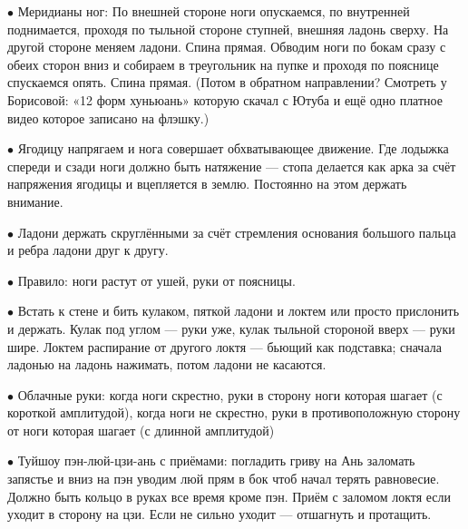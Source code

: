 \item{$\bullet$} Меридианы ног:
 По внешней стороне ноги опускаемся, по внутренней поднимается, проходя по тыльной стороне ступней, внешняя ладонь сверху. На другой стороне меняем ладони. Спина прямая.
 Обводим ноги по бокам сразу с обеих сторон вниз и собираем в треугольник на пупке и проходя по пояснице спускаемся опять. Спина прямая. (Потом в обратном направлении? Смотреть у Борисовой: «12 форм хуньюань» которую скачал с Ютуба и ещё одно платное видео которое записано на флэшку.)

\item{$\bullet$} Ягодицу напрягаем и нога совершает обхватывающее движение.
Где лодыжка спереди и сзади ноги должно быть натяжение --- стопа делается как арка за счёт напряжения ягодицы и вцепляется в землю. Постоянно на этом держать внимание.

\item{$\bullet$} Ладони держать скруглёнными за счёт стремления основания большого пальца и ребра ладони друг к другу.

\item{$\bullet$} Правило: ноги растут от ушей, руки от поясницы.

\item{$\bullet$} Встать к стене и бить кулаком, пяткой ладони и локтем или просто прислонить и держать. Кулак под углом --- руки уже, кулак тыльной стороной вверх --- руки шире. Локтем распирание от другого локтя --- бьющий как подставка; сначала ладонью на ладонь нажимать, потом ладони не касаются.

\item{$\bullet$} Облачные руки: когда ноги скрестно, руки в сторону ноги которая шагает
(с короткой амплитудой), когда ноги не скрестно, руки в противоположную сторону от ноги
которая шагает (с длинной амплитудой)

\item{$\bullet$} Туйшоу пэн-люй-цзи-ань с приёмами:
 погладить гриву на Ань
 заломать запястье и вниз на пэн
 уводим люй прям в бок чтоб начал терять равновесие. Должно быть кольцо в руках все время кроме пэн.
Приём с заломом локтя если уходит в сторону на цзи. Если не сильно уходит --- отшагнуть и протащить.

\bye
